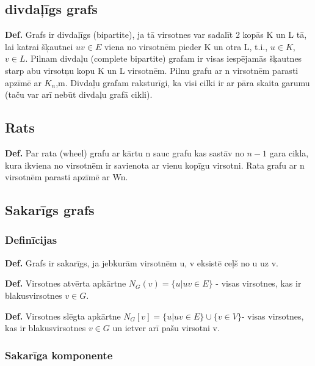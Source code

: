 \documentclass{article}
\begin{document}
\subsection{divdaļīgs grafs}

\textbf{Def.}  Grafs ir divdaļīgs (bipartite), ja tā virsotnes var sadalīt 2 kopās K un L tā, lai katrai šķautnei $uv \in E$ viena no virsotnēm pieder K un otra L, t.i., $u \in K$, $v \in L$.  Pilnam divdaļu (complete bipartite) grafam ir visas iespējamās šķautnes starp abu virsotņu kopu K un L virsotnēm.  Pilnu grafu ar n virsotnēm parasti apzīmē ar $K_n$,m.  Divdaļu grafam raksturīgi, ka visi cilki ir ar pāra skaita garumu (taču var arī nebūt divdaļu grafā cikli).


\subsection{Rats}

\textbf{Def.}  Par rata (wheel) grafu ar kārtu n sauc grafu kas sastāv no $n-1$ gara cikla, kura ikviena no virsotnēm ir savienota ar vienu kopīgu virsotni.  Rata grafu ar n virsotnēm parasti apzīmē ar Wn.

\subsection{Sakarīgs grafs}

\subsubsection{Definīcijas}

\textbf{Def.}  Grafs ir sakarīgs, ja jebkurām virsotnēm u, v eksistē ceļš no u uz v.


\textbf{Def.} Virsotnes atvērta apkārtne $N_G (v ) = \{u|uv \in E \}$ - visas virsotnes, kas ir blakusvirsotnes $v \in G$.

\textbf{Def.} Virsotnes slēgta apkārtne $N_G [v ] = \{u|uv \in E \} \cup \{v \in V \} $- visas virsotnes, kas ir blakusvirsotnes $v \in G$ un ietver arī pašu virsotni v.

\subsubsection{Sakarīga komponente}
\end{document}
